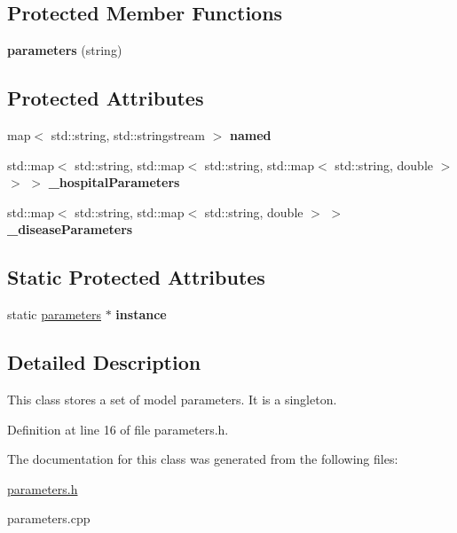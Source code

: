 \subsection*{Protected Member Functions}
\begin{DoxyCompactItemize}
\item 
\mbox{\label{classparameters_ab172d29c480f616c125b126fd7ea34d6}} 
{\bfseries parameters} (string)
\end{DoxyCompactItemize}
\subsection*{Protected Attributes}
\begin{DoxyCompactItemize}
\item 
\mbox{\label{classparameters_a2ab9d29b33ee487a519f300b363cce3b}} 
map$<$ std\+::string, std\+::stringstream $>$ {\bfseries named}
\item 
\mbox{\label{classparameters_a4c0787e1340a7564206348efd80cf507}} 
std\+::map$<$ std\+::string, std\+::map$<$ std\+::string, std\+::map$<$ std\+::string, double $>$ $>$ $>$ {\bfseries \+\_\+hospital\+Parameters}
\item 
\mbox{\label{classparameters_a3ddb7a78e3dddb388a8a7029f5ef5ac5}} 
std\+::map$<$ std\+::string, std\+::map$<$ std\+::string, double $>$ $>$ {\bfseries \+\_\+disease\+Parameters}
\end{DoxyCompactItemize}
\subsection*{Static Protected Attributes}
\begin{DoxyCompactItemize}
\item 
\mbox{\label{classparameters_abc1d17f187dfc52b3de807d863e94390}} 
static \mbox{\hyperlink{classparameters}{parameters}} $\ast$ {\bfseries instance}
\end{DoxyCompactItemize}


\subsection{Detailed Description}
This class stores a set of model parameters. It is a singleton. 

Definition at line 16 of file parameters.\+h.



The documentation for this class was generated from the following files\+:\begin{DoxyCompactItemize}
\item 
\mbox{\hyperlink{parameters_8h}{parameters.\+h}}\item 
parameters.\+cpp\end{DoxyCompactItemize}

